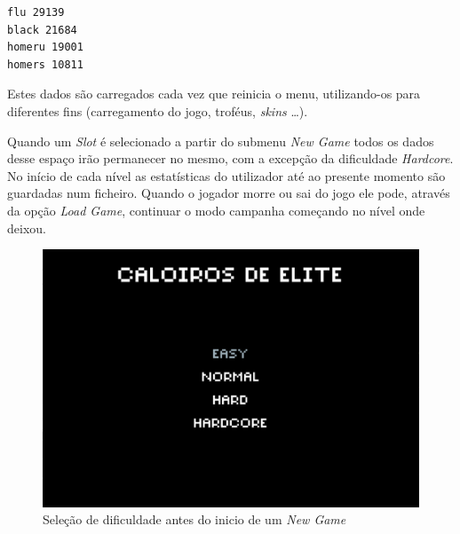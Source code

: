 \documentclass[a4paper,11pt]{article}
\newcommand\tab[1][0.8cm]{\hspace*{#1}}
\begin{document}
\vspace{8pt}

\begin{lstlisting}
flu 29139
black 21684
homeru 19001
homers 10811
    \end{lstlisting}

\vspace{8pt}

Estes dados são carregados cada vez que reinicia o menu, utilizando-os para diferentes fins (carregamento do jogo, troféus, \textit{skins} \dots).

\vspace{8pt}

\tab Quando um \textit{Slot} é selecionado a partir do submenu \textit{New Game} todos os dados desse espaço irão permanecer no mesmo, com a excepção da dificuldade \textit{Hardcore}. No início de cada nível as estatísticas do utilizador até ao presente momento são guardadas num ficheiro. Quando o jogador morre ou sai do jogo ele pode, através da opção \textit{Load Game}, continuar o modo campanha começando no nível onde deixou.

\begin{figure}[H]
    \centering
    \includegraphics[scale = 0.50]{1 - Imagens/SelectionScreen.png}
    \caption{Seleção de dificuldade antes do inicio de um \textit{New Game}}
    \label{fig:NewGame}
\end{figure}



\vspace{8pt}
\end{document}

